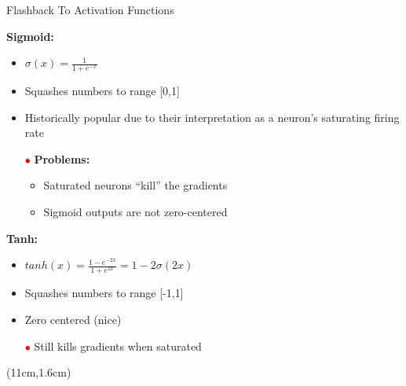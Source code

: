 \documentclass[serif, aspectratio=169]{beamer}
\begin{document}
\begin{frame}{Flashback To Activation Functions}
	
	\textbf{Sigmoid:} 
	\begin{itemize}
		\item $\sigma(x) = \frac{1}{1+e^{-x}}$
		\item Squashes numbers to range [0,1]
		\item Historically popular due to their interpretation \newline as a neuron’s saturating firing rate
		\item[\textcolor{red}{$\bullet$}] \color{red} \textbf{Problems:}
		\begin{itemize}
			\item \color{red} Saturated neurons “kill” the gradients
			\item \color{red} Sigmoid outputs are not zero-centered
		\end{itemize}
	\end{itemize}
	\textbf{Tanh:}
	\begin{itemize}
		\item $tanh(x) = \frac{1-e^{-2x}}{1+e^{2x}} = 1 - 2\sigma(2x)$
		\item Squashes numbers to range [-1,1]
		\item Zero centered (nice)
		\item[\textcolor{red}{$\bullet$}] \color{red} Still kills gradients when saturated
	\end{itemize}
	\begin{textblock*}{5cm}(11cm,1.6cm) %
	\begin{figure}[htbp]
		\begin{center}

\end{center}
\end{figure}
\end{textblock*}
\end{frame}
\end{document}
